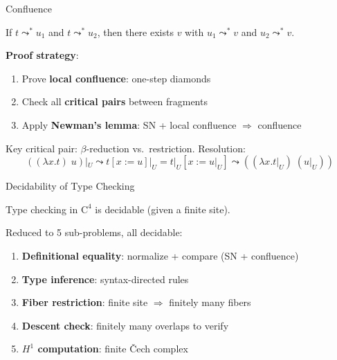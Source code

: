 \documentclass[aspectratio=169,11pt]{beamer}
\newcommand{\Cfour}{\mathrm{C}^4}
\begin{document}
\begin{frame}{Confluence}
\begin{theorem}[Confluence]
If $t \leadsto^* u_1$ and $t \leadsto^* u_2$, then there exists $v$ with $u_1 \leadsto^* v$ and $u_2 \leadsto^* v$.
\end{theorem}

\vspace{0.5em}
\textbf{Proof strategy}:
\begin{enumerate}
\item Prove \textbf{local confluence}: one-step diamonds
\item Check all \textbf{critical pairs} between fragments
\item Apply \textbf{Newman's lemma}: SN + local confluence $\Rightarrow$ confluence
\end{enumerate}

\vspace{0.5em}
Key critical pair: $\beta$-reduction vs.\ restriction. Resolution:
\[
((\lambda x.t)\;u)|_U \leadsto t[x:=u]|_U = t|_U[x := u|_U] \leadsto ((\lambda x. t|_U)\;(u|_U))
\]
\end{frame}

\begin{frame}{Decidability of Type Checking}
\begin{theorem}[Decidability]
Type checking in $\Cfour$ is decidable (given a finite site).
\end{theorem}

\vspace{0.5em}
Reduced to 5 sub-problems, all decidable:
\begin{enumerate}
\item \textbf{Definitional equality}: normalize + compare (SN + confluence)
\item \textbf{Type inference}: syntax-directed rules
\item \textbf{Fiber restriction}: finite site $\Rightarrow$ finitely many fibers
\item \textbf{Descent check}: finitely many overlaps to verify
\item \textbf{$H^1$ computation}: finite \v{C}ech complex
\end{enumerate}
\end{frame}
\end{document}
